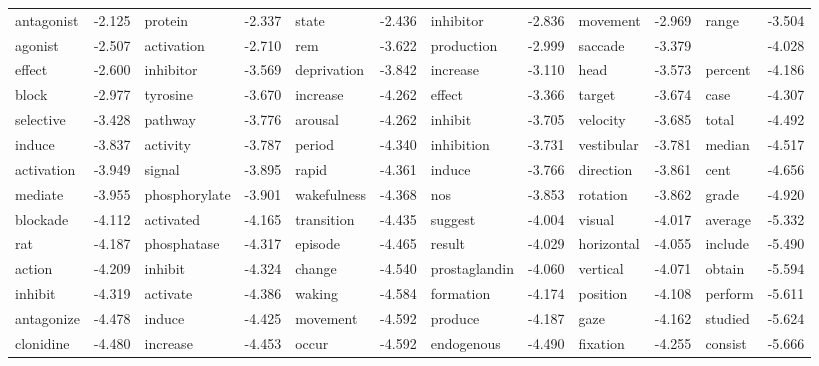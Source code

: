 \documentclass{article}
\begin{document}
\begin{table}
{\begin{tabular}{|l r|l r|l r|l r|l r|l r|}
antagonist & -2.125 & protein & -2.337 & state & -2.436 & inhibitor & -2.836 & movement & -2.969 & range & -3.504\\
agonist & -2.507 & activation & -2.710 & rem & -3.622 & production & -2.999 & saccade & -3.379 &  & -4.028\\
effect & -2.600 & inhibitor & -3.569 & deprivation & -3.842 & increase & -3.110 & head & -3.573 & percent & -4.186\\
block & -2.977 & tyrosine & -3.670 & increase & -4.262 & effect & -3.366 & target & -3.674 & case & -4.307\\
selective & -3.428 & pathway & -3.776 & arousal & -4.262 & inhibit & -3.705 & velocity & -3.685 & total & -4.492\\
induce & -3.837 & activity & -3.787 & period & -4.340 & inhibition & -3.731 & vestibular & -3.781 & median & -4.517\\
activation & -3.949 & signal & -3.895 & rapid & -4.361 & induce & -3.766 & direction & -3.861 & cent & -4.656\\
mediate & -3.955 & phosphorylate & -3.901 & wakefulness & -4.368 & nos & -3.853 & rotation & -3.862 & grade & -4.920\\
blockade & -4.112 & activated & -4.165 & transition & -4.435 & suggest & -4.004 & visual & -4.017 & average & -5.332\\
rat & -4.187 & phosphatase & -4.317 & episode & -4.465 & result & -4.029 & horizontal & -4.055 & include & -5.490\\
action & -4.209 & inhibit & -4.324 & change & -4.540 & prostaglandin & -4.060 & vertical & -4.071 & obtain & -5.594\\
inhibit & -4.319 & activate & -4.386 & waking & -4.584 & formation & -4.174 & position & -4.108 & perform & -5.611\\
antagonize & -4.478 & induce & -4.425 & movement & -4.592 & produce & -4.187 & gaze & -4.162 & studied & -5.624\\
clonidine & -4.480 & increase & -4.453 & occur & -4.592 & endogenous & -4.490 & fixation & -4.255 & consist & -5.666\\
\hline
\end{tabular}
}
\end{table}
\end{document}
